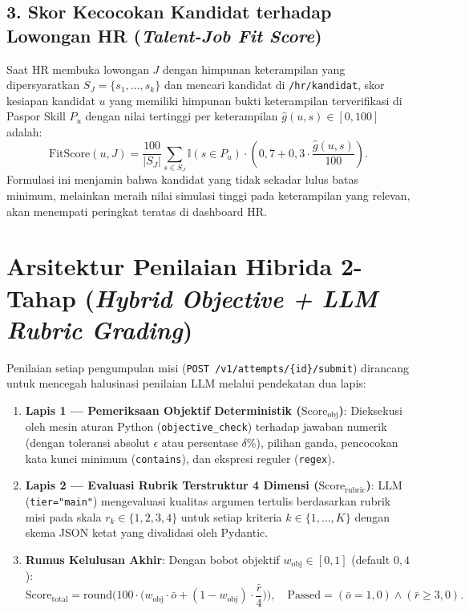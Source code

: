 \documentclass[11pt,a4paper]{report}
\begin{document}
\subsection{3. Skor Kecocokan Kandidat terhadap Lowongan HR (\textit{Talent-Job Fit Score})}
Saat HR membuka lowongan $J$ dengan himpunan keterampilan yang dipersyaratkan $S_J = \{s_1, \dots, s_k\}$ dan mencari kandidat di \texttt{/hr/kandidat}, skor kesiapan kandidat $u$ yang memiliki himpunan bukti keterampilan terverifikasi di Paspor Skill $P_u$ dengan nilai tertinggi per keterampilan $\hat{g}(u, s) \in [0, 100]$ adalah:
\[
\text{FitScore}(u, J) = \frac{100}{|S_J|} \sum_{s \in S_J} \mathbb{I}(s \in P_u) \cdot \left(0{,}7 + 0{,}3 \cdot \frac{\hat{g}(u, s)}{100}\right).
\]
Formulasi ini menjamin bahwa kandidat yang tidak sekadar lulus batas minimum, melainkan meraih nilai simulasi tinggi pada keterampilan yang relevan, akan menempati peringkat teratas di dashboard HR.

\section{Arsitektur Penilaian Hibrida 2-Tahap (\textit{Hybrid Objective + LLM Rubric Grading})}
Penilaian setiap pengumpulan misi (\texttt{POST /v1/attempts/\{id\}/submit}) dirancang untuk mencegah halusinasi penilaian LLM melalui pendekatan dua lapis:
\begin{enumerate}[leftmargin=1.5em]
    \item \textbf{Lapis 1 --- Pemeriksaan Objektif Deterministik ($\text{Score}_{\text{obj}}$)}:
    Dieksekusi oleh mesin aturan Python (\texttt{objective\_check}) terhadap jawaban numerik (dengan toleransi absolut $\epsilon$ atau persentase $\delta\%$), pilihan ganda, pencocokan kata kunci minimum (\texttt{contains}), dan ekspresi reguler (\texttt{regex}).
    \item \textbf{Lapis 2 --- Evaluasi Rubrik Terstruktur 4 Dimensi ($\text{Score}_{\text{rubric}}$)}:
    LLM (\texttt{tier="main"}) mengevaluasi kualitas argumen tertulis berdasarkan rubrik misi pada skala $r_k \in \{1, 2, 3, 4\}$ untuk setiap kriteria $k \in \{1, \dots, K\}$ dengan skema JSON ketat yang divalidasi oleh Pydantic.
    \item \textbf{Rumus Kelulusan Akhir}:
    Dengan bobot objektif $w_{\text{obj}} \in [0, 1]$ (default $0{,}4$):
    \[
    \text{Score}_{\text{total}} = \text{round}\!\Big(100 \cdot \big(w_{\text{obj}} \cdot \bar{o} + (1 - w_{\text{obj}}) \cdot \frac{\bar{r}}{4}\big)\Big), \quad
    \text{Passed} = (\bar{o} = 1{,}0) \land (\bar{r} \ge 3{,}0).
    \]
\end{enumerate}
\end{document}
